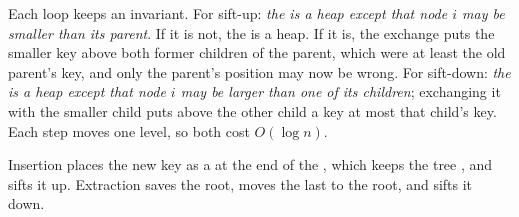 \label{lst:b1:heaps:sift}

Each loop keeps an invariant. For sift-up: \emph{the  is a heap except that node $i$ may be smaller than its
parent}. If it is not, the  is a heap. If it is, the exchange puts the smaller key above both former children of the
parent, which were at least the old parent's key, and only the parent's position may now be wrong. For sift-down:
\emph{the  is a heap except that node $i$ may be larger than one of its children}; exchanging it with the smaller
child puts above the other child a key at most that child's key. Each step moves one level, so both cost $O(\log n)$.

Insertion places the new key as a  at the end of the , which keeps the tree , and sifts it up.
Extraction saves the root, moves the last  to the root, and sifts it down.

\label{lst:b1:heaps:push-pop}

\label{out:b1:heaps:demo}

